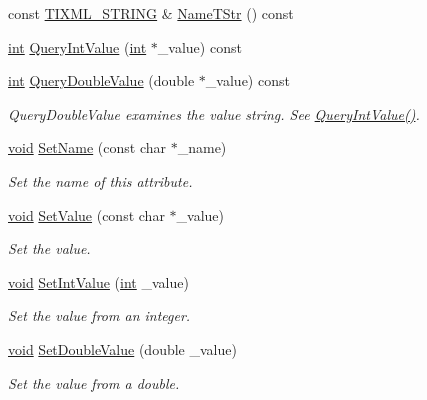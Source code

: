 \begin{DoxyCompactItemize}
const \hyperlink{tinyxml_8h_a92bada05fd84d9a0c9a5bbe53de26887}{T\-I\-X\-M\-L\-\_\-\-S\-T\-R\-I\-N\-G} \& \hyperlink{class_ti_xml_attribute_a64cee17bceb8232eb0736d26dd082d79}{Name\-T\-Str} () const 
\item 
\hyperlink{wglew_8h_a500a82aecba06f4550f6849b8099ca21}{int} \hyperlink{class_ti_xml_attribute_ad6c93088ee21af41a107931223339344}{Query\-Int\-Value} (\hyperlink{wglew_8h_a500a82aecba06f4550f6849b8099ca21}{int} $\ast$\-\_\-value) const 
\item 
\hyperlink{wglew_8h_a500a82aecba06f4550f6849b8099ca21}{int} \hyperlink{class_ti_xml_attribute_ac87b2a8489906a5d7aa2875f20be3513}{Query\-Double\-Value} (double $\ast$\-\_\-value) const 
\begin{DoxyCompactList}\small\item\em Query\-Double\-Value examines the value string. See \hyperlink{class_ti_xml_attribute_ad6c93088ee21af41a107931223339344}{Query\-Int\-Value()}. \end{DoxyCompactList}\item 
\hyperlink{wglew_8h_aeea6e3dfae3acf232096f57d2d57f084}{void} \hyperlink{class_ti_xml_attribute_ab7fa3d21ff8d7c5764cf9af15b667a99}{Set\-Name} (const char $\ast$\-\_\-name)
\begin{DoxyCompactList}\small\item\em Set the name of this attribute. \end{DoxyCompactList}\item 
\hyperlink{wglew_8h_aeea6e3dfae3acf232096f57d2d57f084}{void} \hyperlink{class_ti_xml_attribute_a2dae44178f668b3cb48101be4f2236a0}{Set\-Value} (const char $\ast$\-\_\-value)
\begin{DoxyCompactList}\small\item\em Set the value. \end{DoxyCompactList}\item 
\hyperlink{wglew_8h_aeea6e3dfae3acf232096f57d2d57f084}{void} \hyperlink{class_ti_xml_attribute_a7e065df640116a62ea4f4b7da5449cc8}{Set\-Int\-Value} (\hyperlink{wglew_8h_a500a82aecba06f4550f6849b8099ca21}{int} \-\_\-value)
\begin{DoxyCompactList}\small\item\em Set the value from an integer. \end{DoxyCompactList}\item 
\hyperlink{wglew_8h_aeea6e3dfae3acf232096f57d2d57f084}{void} \hyperlink{class_ti_xml_attribute_a0316da31373496c4368ad549bf711394}{Set\-Double\-Value} (double \-\_\-value)
\begin{DoxyCompactList}\small\item\em Set the value from a double. \end{DoxyCompactList}\item 

\end{DoxyCompactItemize}
